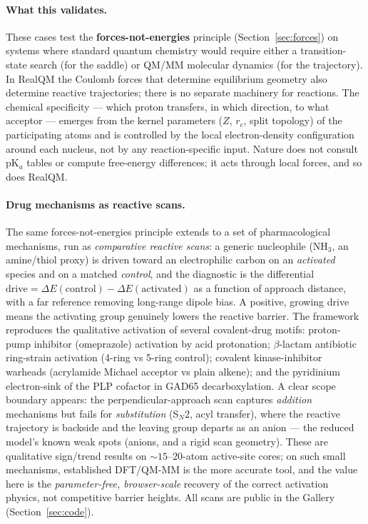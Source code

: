\documentclass[11pt]{article}
\begin{document}
\paragraph{What this validates.}
These cases test the \textbf{forces-not-energies} principle (Section~\ref{sec:forces}) on systems where standard quantum chemistry would require either a transition-state search (for the saddle) or QM/MM molecular dynamics (for the trajectory). In RealQM the Coulomb forces that determine equilibrium geometry also determine reactive trajectories; there is no separate machinery for reactions. The chemical specificity --- which proton transfers, in which direction, to what acceptor --- emerges from the kernel parameters ($Z$, $r_c$, split topology) of the participating atoms and is controlled by the local electron-density configuration around each nucleus, not by any reaction-specific input. Nature does not consult pK$_a$ tables or compute free-energy differences; it acts through local forces, and so does RealQM.

\paragraph{Drug mechanisms as reactive scans.}
The same forces-not-energies principle extends to a set of pharmacological mechanisms, run as
\emph{comparative reactive scans}: a generic nucleophile (NH$_3$, an amine/thiol proxy) is driven
toward an electrophilic carbon on an \emph{activated} species and on a matched \emph{control}, and the
diagnostic is the differential $\mathrm{drive} = \Delta E(\text{control}) - \Delta E(\text{activated})$
as a function of approach distance, with a far reference removing long-range dipole bias. A positive,
growing drive means the activating group genuinely lowers the reactive barrier. The framework
reproduces the qualitative activation of several covalent-drug motifs: proton-pump inhibitor
(omeprazole) activation by acid protonation; $\beta$-lactam antibiotic ring-strain activation
(4-ring vs 5-ring control); covalent kinase-inhibitor warheads (acrylamide Michael acceptor vs plain
alkene); and the pyridinium electron-sink of the PLP cofactor in GAD65 decarboxylation. A clear scope
boundary appears: the perpendicular-approach scan captures \emph{addition} mechanisms but fails for
\emph{substitution} (S$_N$2, acyl transfer), where the reactive trajectory is backside and the
leaving group departs as an anion --- the reduced model's known weak spots (anions, and a rigid
scan geometry). These are qualitative sign/trend results on $\sim\!15$--$20$-atom active-site cores;
on such small mechanisms, established DFT/QM-MM is the more accurate tool, and the value here is the
\emph{parameter-free, browser-scale} recovery of the correct activation physics, not competitive
barrier heights. All scans are public in the Gallery (Section~\ref{sec:code}).
\end{document}
